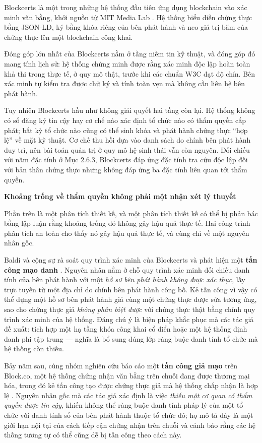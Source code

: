 Blockcerts là một trong những hệ thống đầu tiên ứng dụng blockchain vào xác minh văn bằng, khởi nguồn từ MIT Media Lab \cite{Blockcerts2016}. Hệ thống biểu diễn chứng thực bằng JSON-LD, ký bằng khóa riêng của bên phát hành và neo giá trị băm của chứng thực lên một blockchain công khai.

Đóng góp lớn nhất của Blockcerts nằm ở tầng niềm tin kỹ thuật, và đóng góp đó mang tính lịch sử: hệ thống chứng minh được rằng xác minh độc lập hoàn toàn khả thi trong thực tế, ở quy mô thật, trước khi các chuẩn W3C đạt độ chín. Bên xác minh tự kiểm tra được chữ ký và tính toàn vẹn mà không cần liên hệ bên phát hành.

Tuy nhiên Blockcerts hầu như không giải quyết hai tầng còn lại. Hệ thống không có sổ đăng ký tin cậy hay cơ chế nào xác định tổ chức nào có thẩm quyền cấp phát; bất kỳ tổ chức nào cũng có thể sinh khóa và phát hành chứng thực {``}hợp lệ{''} về mặt kỹ thuật. Cơ chế thu hồi dựa vào danh sách do chính bên phát hành duy trì, nên bài toán quản trị ở quy mô hệ sinh thái vẫn còn nguyên. Đối chiếu với năm đặc tính ở Mục 2.6.3, Blockcerts đáp ứng đặc tính tra cứu độc lập đối với bản thân chứng thực nhưng không đáp ứng ba đặc tính liên quan tới thẩm quyền.

\noindent \textbf{Khoảng trống về thẩm quyền không phải một nhận xét lý thuyết}

Phần trên là một phân tích thiết kế, và một phân tích thiết kế có thể bị phản bác bằng lập luận rằng khoảng trống đó không gây hậu quả thực tế. Hai công trình phân tích an toàn cho thấy nó gây hậu quả thực tế, và cùng chỉ về một nguyên nhân gốc.

Baldi và cộng sự rà soát quy trình xác minh của Blockcerts và phát hiện một \textbf{tấn công mạo danh} \cite{Baldi2019}. Nguyên nhân nằm ở chỗ quy trình xác minh đối chiếu danh tính của bên phát hành với một \emph{hồ sơ bên phát hành không được xác thực}, lấy trực tuyến từ một địa chỉ do chính bên phát hành công bố. Kẻ tấn công vì vậy có thể dựng một hồ sơ bên phát hành giả cùng một chứng thực được sửa tương ứng, sao cho chứng thực giả \emph{không phân biệt được} với chứng thực thật bằng chính quy trình xác minh của hệ thống. Đáng chú ý là biện pháp khắc phục mà các tác giả đề xuất: tích hợp một hạ tầng khóa công khai cổ điển hoặc một hệ thống định danh phi tập trung --- nghĩa là bổ sung đúng lớp ràng buộc danh tính tổ chức mà hệ thống còn thiếu.

Bảy năm sau, cùng nhóm nghiên cứu báo cáo một \textbf{tấn công giả mạo} trên Block.co, một hệ thống chứng nhận văn bằng trên chuỗi đang được thương mại hóa, trong đó kẻ tấn công tạo được chứng thực giả mà hệ thống chấp nhận là hợp lệ \cite{Zonneveld2026}. Nguyên nhân gốc mà các tác giả xác định là việc \emph{thiếu một cơ quan có thẩm quyền được tin cậy}, khiến không thể ràng buộc danh tính pháp lý của một tổ chức với danh tính số của bên phát hành thuộc tổ chức đó; họ mô tả đây là một giới hạn nội tại của cách tiếp cận chứng nhận trên chuỗi và cảnh báo rằng các hệ thống tương tự có thể cũng dễ bị tấn công theo cách này.

